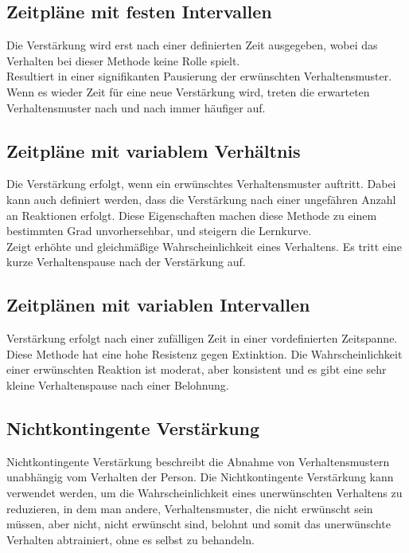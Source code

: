		\subsection{Zeitpläne mit festen Intervallen}
		
		Die Verstärkung wird erst nach einer definierten Zeit ausgegeben, wobei das Verhalten bei dieser Methode keine Rolle spielt. \\
Resultiert in einer signifikanten Pausierung der erwünschten Verhaltensmuster. Wenn es wieder Zeit für eine neue Verstärkung wird, treten die erwarteten Verhaltensmuster nach und nach immer häufiger auf. \\

		\subsection{Zeitpläne mit variablem Verhältnis}
		
		Die Verstärkung erfolgt, wenn ein erwünschtes Verhaltensmuster auftritt. Dabei kann auch definiert werden, dass die Verstärkung nach einer ungefähren Anzahl an Reaktionen erfolgt. Diese Eigenschaften machen diese Methode zu einem bestimmten Grad unvorhersehbar, und steigern die Lernkurve. \\
Zeigt erhöhte und gleichmäßige Wahrscheinlichkeit eines Verhaltens. Es tritt eine kurze Verhaltenspause nach der Verstärkung auf. \\

		\subsection{Zeitplänen mit variablen Intervallen}
		
		Verstärkung erfolgt nach einer zufälligen Zeit in einer vordefinierten Zeitspanne. \\
Diese Methode hat eine hohe Resistenz gegen Extinktion. Die Wahrscheinlichkeit einer erwünschten Reaktion ist moderat, aber konsistent und es gibt eine sehr kleine Verhaltenspause nach einer Belohnung. \\

		
		\subsection{Nichtkontingente Verstärkung}
		
		Nichtkontingente Verstärkung beschreibt die Abnahme von Verhaltensmustern unabhängig vom Verhalten der Person. Die Nichtkontingente Verstärkung kann verwendet werden, um die Wahrscheinlichkeit eines unerwünschten Verhaltens zu reduzieren, in dem man andere, Verhaltensmuster, die nicht erwünscht sein müssen, aber nicht, nicht erwünscht sind, belohnt und somit das unerwünschte Verhalten abtrainiert, ohne es selbst zu behandeln. \\
